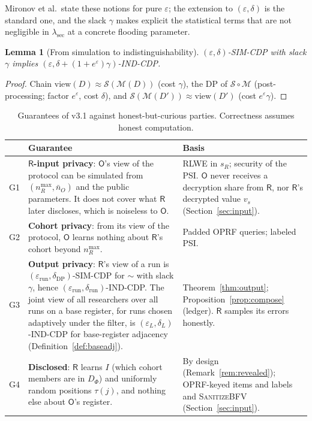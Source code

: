 \documentclass[11pt]{article}
\theoremstyle{definition}
\theoremstyle{plain}
\newtheorem{lemma}{Lemma}[section]
\newcommand{\Party}[1]{\textsf{#1}}
\newcommand{\Rp}{\Party{R}}
\newcommand{\Op}{\Party{O}}
\begin{document}
Mironov et al.\ state these notions for pure $\varepsilon$; the extension to $(\varepsilon, \delta)$ is the standard one, and the slack $\gamma$ makes explicit the statistical terms that are not negligible in $\lambda_{\mathrm{sec}}$ at a concrete flooding parameter.

\begin{lemma}[From simulation to indistinguishability]
\label{lem:sim2ind}
$(\varepsilon, \delta)$-SIM-CDP with slack $\gamma$ implies $(\varepsilon, \delta + (1 + e^{\varepsilon})\gamma)$-IND-CDP.
\end{lemma}

\begin{proof}
Chain $\mathrm{view}(D) \approx \mathcal S(\mathcal M(D))$ (cost $\gamma$), the DP of $\mathcal S \circ \mathcal M$ (post-processing; factor $e^{\varepsilon}$, cost $\delta$), and $\mathcal S(\mathcal M(D')) \approx \mathrm{view}(D')$ (cost $e^{\varepsilon}\gamma$).
\end{proof}

\begin{table}[ht]
\centering\small
\caption{Guarantees of v3.1 against honest-but-curious parties. Correctness assumes honest computation.}
\label{tab:guarantees}
\begin{tabularx}{\textwidth}{@{}l>{\raggedright\arraybackslash}X>{\raggedright\arraybackslash}X@{}}
\toprule
 & Guarantee & Basis \\
\midrule
G1 & \textbf{$\Rp$-input privacy}: $\Op$'s view of the protocol can be simulated from $(n_R^{\max}, \bar n_O)$ and the public parameters. It does not cover what $\Rp$ later discloses, which is noiseless to $\Op$. & RLWE in $s_R$; security of the PSI. $\Op$ never receives a decryption share from $\Rp$, nor $\Rp$'s decrypted value $v_s$ (Section~\ref{sec:input}). \\
G2 & \textbf{Cohort privacy}: from its view of the protocol, $\Op$ learns nothing about $\Rp$'s cohort beyond $n_R^{\max}$. & Padded OPRF queries; labeled PSI. \\
G3 & \textbf{Output privacy}: $\Rp$'s view of a run is $(\varepsilon_{\mathrm{run}}, \delta_{\mathrm{DP}})$-SIM-CDP for $\sim$ with slack $\gamma$, hence $(\varepsilon_{\mathrm{run}}, \delta_{\mathrm{run}})$-IND-CDP. The joint view of all researchers over all runs on a base register, for runs chosen adaptively under the filter, is $(\varepsilon_L, \delta_L)$-IND-CDP for base-register adjacency (Definition~\ref{def:baseadj}). & Theorem~\ref{thm:output}; Proposition~\ref{prop:compose} (ledger). $\Rp$ samples its errors honestly. \\
G4 & \textbf{Disclosed}: $\Rp$ learns $I$ (which cohort members are in $D_\Phi$) and uniformly random positions $\tau(j)$, and nothing else about $\Op$'s register. & By design (Remark~\ref{rem:revealed}); OPRF-keyed items and labels and \textsc{SanitizeBFV} (Section~\ref{sec:input}). \\
\bottomrule
\end{tabularx}
\end{table}
\end{document}
